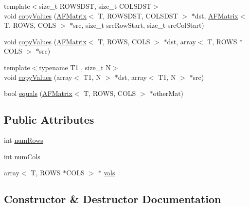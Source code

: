 \begin{DoxyCompactItemize}
\item 
{\footnotesize template$<$size\+\_\+t R\+O\+W\+S\+D\+ST, size\+\_\+t C\+O\+L\+S\+D\+ST$>$ }\\void \hyperlink{class_a_f_matrix_afc51204548b2e7ca35c1c3bee350e11b}{copy\+Values} (\hyperlink{class_a_f_matrix}{A\+F\+Matrix}$<$ T, R\+O\+W\+S\+D\+ST, C\+O\+L\+S\+D\+ST $>$ $\ast$dst, \hyperlink{class_a_f_matrix}{A\+F\+Matrix}$<$ T, R\+O\+WS, C\+O\+LS $>$ $\ast$src, size\+\_\+t src\+Row\+Start, size\+\_\+t src\+Col\+Start)
\item 
void \hyperlink{class_a_f_matrix_ac655b95d85d38a72621381b5cf89df83}{copy\+Values} (\hyperlink{class_a_f_matrix}{A\+F\+Matrix}$<$ T, R\+O\+WS, C\+O\+LS $>$ $\ast$dst, array$<$ T, R\+O\+WS $\ast$C\+O\+LS $>$ $\ast$src)
\item 
{\footnotesize template$<$typename T1 , size\+\_\+t N$>$ }\\void \hyperlink{class_a_f_matrix_ac8930dd6d5ea5167fed5c768b96635f7}{copy\+Values} (array$<$ T1, N $>$ $\ast$dst, array$<$ T1, N $>$ $\ast$src)
\item 
bool \hyperlink{class_a_f_matrix_ab0187dbba61ef71f91e6b4365924ffe3}{equals} (\hyperlink{class_a_f_matrix}{A\+F\+Matrix}$<$ T, R\+O\+WS, C\+O\+LS $>$ $\ast$other\+Mat)
\end{DoxyCompactItemize}
\subsection*{Public Attributes}
\begin{DoxyCompactItemize}
\item 
int \hyperlink{class_a_f_matrix_a8e18ed7d084bfa8b040f7abd89918b42}{num\+Rows}
\item 
int \hyperlink{class_a_f_matrix_aed28746540fcca94d5d1448b098b4ecc}{num\+Cols}
\item 
array$<$ T, R\+O\+WS $\ast$C\+O\+LS $>$ $\ast$ \hyperlink{class_a_f_matrix_abca47cc50d551c1e8d79559773729e87}{vals}
\end{DoxyCompactItemize}


\subsection{Constructor \& Destructor Documentation}
\mbox{\label{class_a_f_matrix_a6ccd1bdad16dfa7ef38db5e0fc4e0e2b}} 
